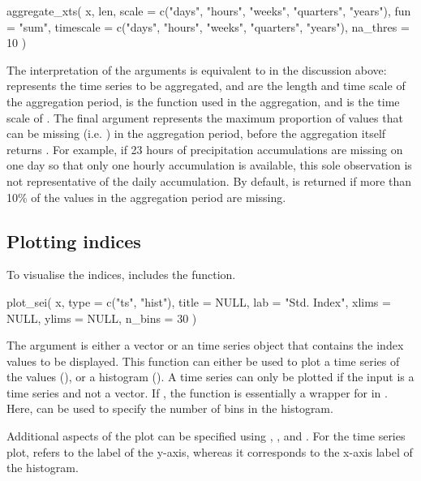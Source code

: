 \documentclass[article,shortnames,nojss]{jss}\usepackage[]{graphicx}\usepackage[]{xcolor}
\begin{document}
\begin{Code}
aggregate_xts(
  x,
  len,
  scale = c("days", "hours", "weeks", "quarters", "years"),
  fun = "sum",
  timescale = c("days", "hours", "weeks", "quarters", "years"),
  na_thres = 10
)
\end{Code}

The interpretation of the arguments is equivalent to in the discussion above:  represents the  time series to be aggregated,  and  are the length and time scale of the aggregation period,  is the function used in the aggregation, and  is the time scale of . The final argument  represents the maximum proportion of values that can be missing (i.e. ) in the aggregation period, before the aggregation itself returns . For example, if 23 hours of precipitation accumulations are missing on one day so that only one hourly accumulation is available, this sole observation is not representative of the daily accumulation. By default,  is returned if more than 10\% of the values in the aggregation period are missing.


\subsection{Plotting indices}

To visualise the indices,  includes the  function.

\begin{Code}
plot_sei(
  x,
  type = c("ts", "hist"),
  title = NULL,
  lab = "Std. Index",
  xlims = NULL,
  ylims = NULL,
  n_bins = 30
)
\end{Code}

The argument  is either a vector or an  time series object that contains the index values to be displayed. This function can either be used to plot a time series of the values (), or a histogram (). A time series can only be plotted if the input  is a time series and not a vector. If , the function is essentially a wrapper for  in . Here,  can be used to specify the number of bins in the histogram.

Additional aspects of the plot can be specified using , ,  and . For the time series plot,  refers to the label of the y-axis, whereas it corresponds to the x-axis label of the histogram.
\end{document}
